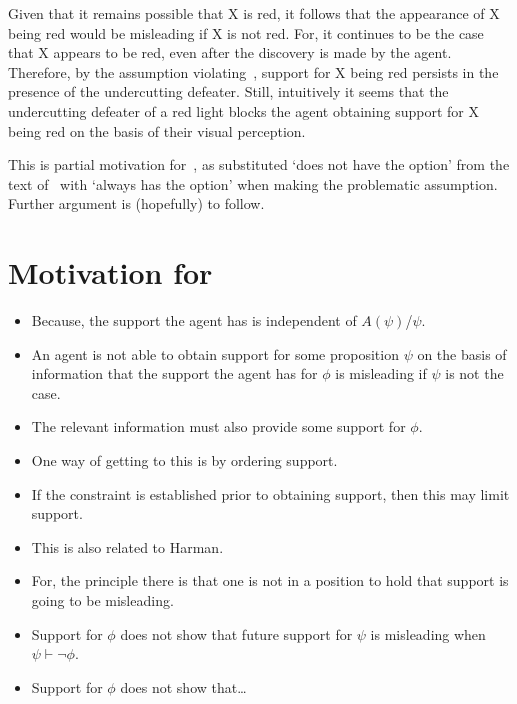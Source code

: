 \begin{note}
  Given that it remains possible that X is red, it follows that the appearance of X being red would be misleading if X is not red.
  For, it continues to be the case that X appears to be red, even after the discovery is made by the agent.
  Therefore, by the assumption violating~\nI{}, support for X being red persists in the presence of the undercutting defeater.
  Still, intuitively it seems that the undercutting defeater of a red light blocks the agent obtaining support for X being red on the basis of their visual perception.

  This is partial motivation for~\nI{}, as substituted `does not have the option' from the text of~\nI{} with `always has the option' when making the problematic assumption.
  Further argument is (hopefully) to follow.

\end{note}


\section{Motivation for \nI{}}
\label{sec:motivation-ni}

\begin{itemize}
\item Because, the support the agent has is independent of \(A(\psi)\)/\(\psi\).
\end{itemize}

\begin{itemize}
\item An agent is not able to obtain support for some proposition \(\psi\) on the basis of information that the support the agent has for \(\phi\) is misleading if \(\psi\) is not the case.
\end{itemize}

\begin{itemize}
\item The relevant information must also provide some support for \(\phi\).
\item One way of getting to this is by ordering support.
\item If the constraint is established prior to obtaining support, then this may limit support.
\end{itemize}

\begin{itemize}
\item This is also related to Harman.
\item For, the principle there is that one is not in a position to hold that support is going to be misleading.
\item Support for \(\phi\) does not show that future support for \(\psi\) is misleading when \(\psi \vdash \lnot\phi\).
\item Support for \(\phi\) does not show that\dots
\end{itemize}


